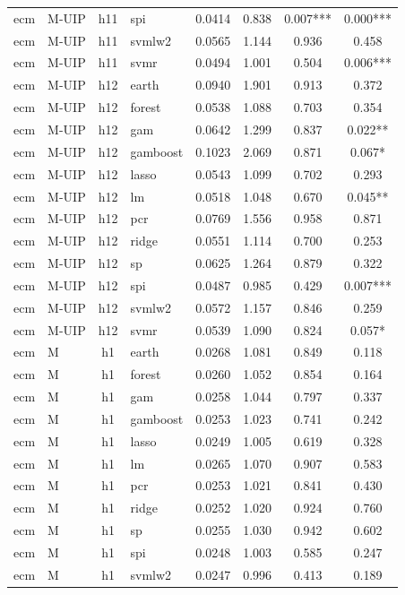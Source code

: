 \begin{ThreePartTable}
\begin{longtable}[t]{llclcccc}
ecm & M-UIP & h11 & spi & 0.0414 & 0.838 & 0.007*** & 0.000***\\
ecm & M-UIP & h11 & svmlw2 & 0.0565 & 1.144 & 0.936 & 0.458\\
ecm & M-UIP & h11 & svmr & 0.0494 & 1.001 & 0.504 & 0.006***\\
\addlinespace
ecm & M-UIP & h12 & earth & 0.0940 & 1.901 & 0.913 & 0.372\\
ecm & M-UIP & h12 & forest & 0.0538 & 1.088 & 0.703 & 0.354\\
ecm & M-UIP & h12 & gam & 0.0642 & 1.299 & 0.837 & 0.022**\\
ecm & M-UIP & h12 & gamboost & 0.1023 & 2.069 & 0.871 & 0.067*\\
ecm & M-UIP & h12 & lasso & 0.0543 & 1.099 & 0.702 & 0.293\\
ecm & M-UIP & h12 & lm & 0.0518 & 1.048 & 0.670 & 0.045**\\
ecm & M-UIP & h12 & pcr & 0.0769 & 1.556 & 0.958 & 0.871\\
ecm & M-UIP & h12 & ridge & 0.0551 & 1.114 & 0.700 & 0.253\\
ecm & M-UIP & h12 & sp & 0.0625 & 1.264 & 0.879 & 0.322\\
ecm & M-UIP & h12 & spi & 0.0487 & 0.985 & 0.429 & 0.007***\\
ecm & M-UIP & h12 & svmlw2 & 0.0572 & 1.157 & 0.846 & 0.259\\
ecm & M-UIP & h12 & svmr & 0.0539 & 1.090 & 0.824 & 0.057*\\
\addlinespace
ecm & M & h1 & earth & 0.0268 & 1.081 & 0.849 & 0.118\\
ecm & M & h1 & forest & 0.0260 & 1.052 & 0.854 & 0.164\\
ecm & M & h1 & gam & 0.0258 & 1.044 & 0.797 & 0.337\\
ecm & M & h1 & gamboost & 0.0253 & 1.023 & 0.741 & 0.242\\
ecm & M & h1 & lasso & 0.0249 & 1.005 & 0.619 & 0.328\\
ecm & M & h1 & lm & 0.0265 & 1.070 & 0.907 & 0.583\\
ecm & M & h1 & pcr & 0.0253 & 1.021 & 0.841 & 0.430\\
ecm & M & h1 & ridge & 0.0252 & 1.020 & 0.924 & 0.760\\
ecm & M & h1 & sp & 0.0255 & 1.030 & 0.942 & 0.602\\
ecm & M & h1 & spi & 0.0248 & 1.003 & 0.585 & 0.247\\
ecm & M & h1 & svmlw2 & 0.0247 & 0.996 & 0.413 & 0.189\\

\end{longtable}
\end{ThreePartTable}

